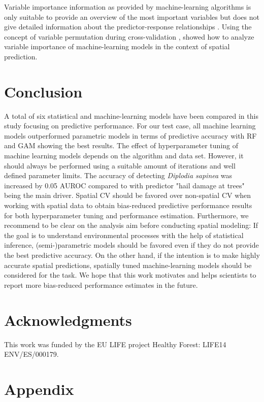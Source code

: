 \documentclass[review]{elsarticle}
\begin{document}
Variable importance information as provided by machine-learning algorithms is only suitable to provide an overview of the most important variables but does not give detailed information about the predictor-response relationships \citep{Hastie2001}.
Using the concept of variable permutation during cross-validation \citep{sperrorest}, \cite{Russ2010a} showed how to analyze variable importance of machine-learning models in the context of spatial prediction.

\section{Conclusion}

A total of six statistical and machine-learning models have been compared in this study focusing on predictive performance.
For our test case, all machine learning models outperformed parametric models in terms of predictive accuracy with \ac{RF} and GAM showing the best results.
The effect of hyperparameter tuning of machine learning models depends on the algorithm and data set.
However, it should always be performed using a suitable amount of iterations and well defined parameter limits.
The accuracy of detecting \textit{Diplodia sapinea} was increased by 0.05 AUROC compared to \cite{Iturritxa2014} with predictor "hail damage at trees" being the main driver.
Spatial \ac{CV} should be favored over non-spatial \ac{CV} when working with spatial data to obtain bias-reduced predictive performance results for both hyperparameter tuning and performance estimation.
Furthermore, we recommend to be clear on the analysis aim before conducting spatial modeling:
If the goal is to understand environmental processes with the help of statistical inference, (semi-)parametric models should be favored even if they do not provide the best predictive accuracy.
On the other hand, if the intention is to make highly accurate spatial predictions, spatially tuned machine-learning models should be considered for the task.
We hope that this work motivates and helps scientists to report more bias-reduced performance estimates in the future.

\section{Acknowledgments}
This work was funded by the EU LIFE project Healthy Forest: LIFE14 ENV/ES/000179.

\section{Appendix}
\end{document}
